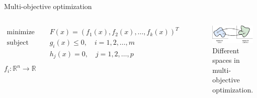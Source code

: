 \documentclass[aspectratio=169,xcolor=dvipsnames]{beamer}
\begin{document}
\begin{frame}{Multi-objective optimization}
    \begin{columns}[c]
        \begin{equation*}
            \begin{aligned}
                \text{minimize }   & \quad F(x) = (f_1(x), f_2(x), \dots, f_k(x))^T \\
                \text{subject to } & \quad g_i(x) \leq 0, \quad i = 1, 2, \dots, m  \\
                                   & \quad h_j(x) = 0, \quad j = 1, 2, \dots, p     \\
            \end{aligned}
        \end{equation*}
        $f_i: \mathbb{R}^n \rightarrow \mathbb{R}$

        \vspace{1em}
        \begin{figure}
            \centering
            \includegraphics[width=0.875\linewidth]{imgs/objective-space.pdf}
            \caption{Different spaces in multi-objective optimization.}
        \end{figure}




\end{columns}
\end{frame}
\end{document}
